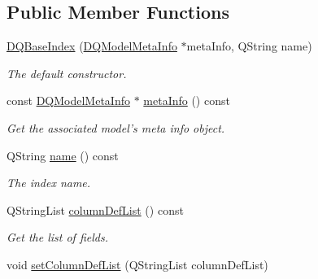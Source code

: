 \subsection*{Public Member Functions}
\begin{DoxyCompactItemize}
\item 
\hyperlink{classDQBaseIndex_af7527247e68f6b6a947e96f0e0781010}{DQBaseIndex} (\hyperlink{classDQModelMetaInfo}{DQModelMetaInfo} $\ast$metaInfo, QString name)
\begin{DoxyCompactList}\small\item\em The default constructor. \item\end{DoxyCompactList}\item 
\hypertarget{classDQBaseIndex_ada04425f089c2a130ee26b19a03e9ee0}{
const \hyperlink{classDQModelMetaInfo}{DQModelMetaInfo} $\ast$ \hyperlink{classDQBaseIndex_ada04425f089c2a130ee26b19a03e9ee0}{metaInfo} () const }
\label{classDQBaseIndex_ada04425f089c2a130ee26b19a03e9ee0}

\begin{DoxyCompactList}\small\item\em Get the associated model's meta info object. \item\end{DoxyCompactList}\item 
\hypertarget{classDQBaseIndex_aee0d4d9f93553c82b6db52d2b5af9844}{
QString \hyperlink{classDQBaseIndex_aee0d4d9f93553c82b6db52d2b5af9844}{name} () const }
\label{classDQBaseIndex_aee0d4d9f93553c82b6db52d2b5af9844}

\begin{DoxyCompactList}\small\item\em The index name. \item\end{DoxyCompactList}\item 
\hypertarget{classDQBaseIndex_aa1eec671727f4b358ec70c2b1b714060}{
QStringList \hyperlink{classDQBaseIndex_aa1eec671727f4b358ec70c2b1b714060}{columnDefList} () const }
\label{classDQBaseIndex_aa1eec671727f4b358ec70c2b1b714060}

\begin{DoxyCompactList}\small\item\em Get the list of fields. \item\end{DoxyCompactList}\item 
\hypertarget{classDQBaseIndex_a2f4550691f38fd762a80e1f2fbf7bd85}{
void \hyperlink{classDQBaseIndex_a2f4550691f38fd762a80e1f2fbf7bd85}{setColumnDefList} (QStringList columnDefList)}
\label{classDQBaseIndex_a2f4550691f38fd762a80e1f2fbf7bd85}


\end{DoxyCompactItemize}

